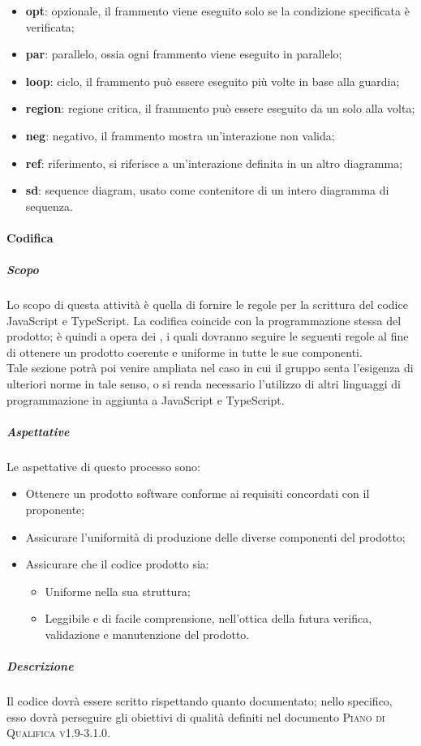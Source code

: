 \documentclass[../norme-di-progetto.tex]{subfiles}
\begin{document}
\begin{itemize}
\begin{itemize}
\begin{itemize}
      \item \textbf{opt}: opzionale, il frammento viene eseguito solo se la condizione specificata è verificata;
      \item \textbf{par}: parallelo, ossia ogni frammento viene eseguito in parallelo;
      \item \textbf{loop}: ciclo, il frammento può essere eseguito più volte in base alla guardia;
      \item \textbf{region}: regione critica, il frammento può essere eseguito da un solo  alla volta;
      \item \textbf{neg}: negativo, il frammento mostra un'interazione non valida;
      \item \textbf{ref}: riferimento, si riferisce a un'interazione definita in un altro diagramma;
      \item \textbf{sd}: sequence diagram, usato come contenitore di un intero diagramma di sequenza.
    \end{itemize}
  \end{itemize}
\end{itemize}

\paragraph{Codifica}
\subparagraph{Scopo}
Lo scopo di questa attività è quella di fornire le regole per la scrittura del codice JavaScript e TypeScript. La codifica coincide con la programmazione stessa del prodotto; è quindi a opera dei , i quali dovranno seguire le seguenti regole al fine di ottenere un prodotto coerente e uniforme in tutte le sue componenti. \\
Tale sezione potrà poi venire ampliata nel caso in cui il gruppo senta l'esigenza di ulteriori norme in tale senso, o si renda necessario l'utilizzo di altri linguaggi di programmazione in aggiunta a JavaScript e TypeScript.
\subparagraph{Aspettative}
Le aspettative di questo processo sono:
\begin{itemize}
  \item Ottenere un prodotto software conforme ai requisiti concordati con il proponente;
  \item Assicurare l'uniformità di produzione delle diverse componenti del prodotto;
  \item Assicurare che il codice prodotto sia:
  \begin{itemize}
    \item Uniforme nella sua struttura;
    \item Leggibile e di facile comprensione, nell'ottica della futura verifica, validazione e manutenzione del prodotto.
  \end{itemize}
\end{itemize}
\subparagraph{Descrizione}
Il codice dovrà essere scritto rispettando quanto documentato; nello specifico, esso dovrà perseguire gli obiettivi di qualità definiti nel documento \textsc{Piano di Qualifica v1.9-3.1.0}.
\end{document}
